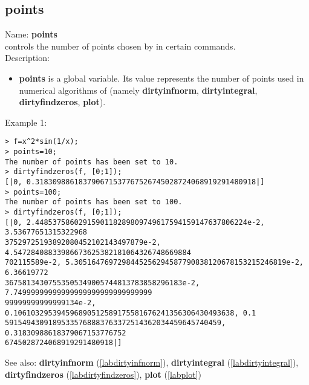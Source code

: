 \subsection{points}
\label{labpoints}
\noindent Name: \textbf{points}\\
controls the number of points chosen by \sollya in certain commands.\\

\noindent Description: \begin{itemize}

\item \textbf{points} is a global variable. Its value represents the number of points
   used in numerical algorithms of \sollya (namely \textbf{dirtyinfnorm},
   \textbf{dirtyintegral}, \textbf{dirtyfindzeros}, \textbf{plot}).
\end{itemize}
\noindent Example 1: 
\begin{center}\begin{minipage}{15cm}\begin{Verbatim}[frame=single]
> f=x^2*sin(1/x);
> points=10;
The number of points has been set to 10.
> dirtyfindzeros(f, [0;1]);
[|0, 0.318309886183790671537767526745028724068919291480918|]
> points=100;
The number of points has been set to 100.
> dirtyfindzeros(f, [0;1]);
[|0, 2.4485375860291590118289809749617594159147637806224e-2, 3.53677651315322968
37529725193892080452102143497879e-2, 4.54728408833986673625382181064326748669884
702115589e-2, 5.3051647697298445256294587790838120678153215246819e-2, 6.36619772
36758134307553505349005744813783858296183e-2, 7.74999999999999999999999999999999
99999999999999134e-2, 0.106103295394596890512589175581676241356306430493638, 0.1
59154943091895335768883763372514362034459645740459, 0.31830988618379067153776752
6745028724068919291480918|]
\end{Verbatim}
\end{minipage}\end{center}
See also: \textbf{dirtyinfnorm} (\ref{labdirtyinfnorm}), \textbf{dirtyintegral} (\ref{labdirtyintegral}), \textbf{dirtyfindzeros} (\ref{labdirtyfindzeros}), \textbf{plot} (\ref{labplot})

